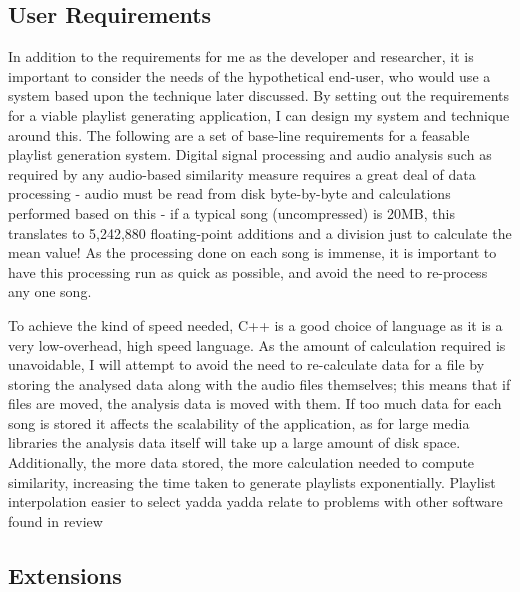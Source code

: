 \subsection{User Requirements}
In addition to the requirements for me as the developer and researcher, it is important to consider the needs of the hypothetical end-user, who would use a system based upon the technique later discussed. By setting out the requirements for a viable playlist generating application, I can design my system and technique around this. The following are a set of base-line requirements for a feasable playlist generation system.
Digital signal processing and audio analysis such as required by any audio-based similarity measure requires a great deal of data processing - audio must be read from disk byte-by-byte and calculations performed based on this - if a typical song (uncompressed) is 20MB, this translates to 5,242,880 floating-point additions and a division just to calculate the mean value! As the processing done on each song is immense, it is important to have this processing run as quick as possible, and avoid the need to re-process any one song.

To achieve the kind of speed needed, C++ is a good choice of language as it is a very low-overhead, high speed language. As the amount of calculation required is unavoidable, I will attempt to avoid the need to re-calculate data for a file by storing the analysed data along with the audio files themselves; this means that if files are moved, the analysis data is moved with them.
\label{text:spec:requirement:data}
If too much data for each song is stored it affects the scalability of the application, as for large media libraries the analysis data itself will take up a large amount of disk space. Additionally, the more data stored, the more calculation needed to compute similarity, increasing the time taken to generate playlists exponentially.
Playlist interpolation easier to select yadda yadda 
relate to problems with other software found in review
\subsection{Extensions}
